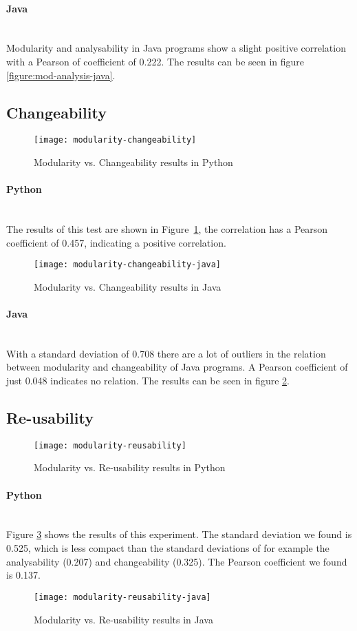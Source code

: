 \documentclass[twoside]{uva-inf-bachelor-thesis}
\newcommand{\myparagraph}[1]{\paragraph{#1}\mbox{}\\}
\begin{document}
\myparagraph{Java}
Modularity and analysability in Java programs show a slight positive correlation with a Pearson of coefficient of 0.222. The results can be seen in figure \ref{figure:mod-analysis-java}.

\subsection{Changeability}

\begin{figure}[H]
    \caption{Modularity vs. Changeability results in Python}
    \label{figure:mod-change}
    \centering
        \texttt{[image: modularity-changeability]}
\end{figure}

\myparagraph{Python}
The results of this test are shown in Figure~\ref{figure:mod-change}, the correlation has a Pearson coefficient of 0.457, indicating a positive correlation.

\begin{figure}[H]
    \caption{Modularity vs. Changeability results in Java}
    \label{figure:mod-change-java}
    \centering
        \texttt{[image: modularity-changeability-java]}
\end{figure}

\myparagraph{Java}
With a standard deviation of 0.708 there are a lot of outliers in the relation between modularity and changeability of Java programs. A Pearson coefficient of just 0.048 indicates no relation. The results can be seen in figure \ref{figure:mod-change-java}.

\subsection{Re-usability}

\begin{figure}[H]
    \caption{Modularity vs. Re-usability results in Python}
    \label{figure:mod-reuse}
    \centering
        \texttt{[image: modularity-reusability]}
\end{figure}

\myparagraph{Python}
Figure \ref{figure:mod-reuse} shows the results of this experiment. The standard deviation we found is 0.525, which is less compact than the standard deviations of for example the analysability (0.207) and changeability (0.325). The Pearson coefficient we found is 0.137.

\begin{figure}[H]
    \caption{Modularity vs. Re-usability results in Java}
    \label{figure:mod-reuse-java}
    \centering
        \texttt{[image: modularity-reusability-java]}
\end{figure}
\end{document}
